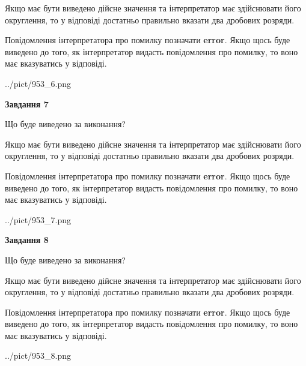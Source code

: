 \documentclass[12pt, ukrainian]{article}
\begin{document}
{\begin {Large}
Якщо має бути виведено дійсне значення та інтерпретатор має здійснювати його округлення, 
то у відповіді достатньо правильно вказати два дробових розряди.

Повідомлення інтерпретатора про помилку позначати \textbf{error}.
Якщо щось буде виведено до того, як інтерпретатор видасть повідомлення про помилку, 
то воно має вказуватись у відповіді. \par

\begin{center}
	{../pict/953_6.png}
\end{center}
\newpage

{\begin {center}\textbf{Завдання 7}\end {center}}\par
Що буде виведено за виконання? \par

Якщо має бути виведено дійсне значення та інтерпретатор має здійснювати його округлення, 
то у відповіді достатньо правильно вказати два дробових розряди.

Повідомлення інтерпретатора про помилку позначати \textbf{error}.
Якщо щось буде виведено до того, як інтерпретатор видасть повідомлення про помилку, 
то воно має вказуватись у відповіді. \par

\begin{center}
	{../pict/953_7.png}
\end{center}
\newpage

{\begin {center}\textbf{Завдання 8}\end {center}}\par
Що буде виведено за виконання? \par

Якщо має бути виведено дійсне значення та інтерпретатор має здійснювати його округлення, 
то у відповіді достатньо правильно вказати два дробових розряди.

Повідомлення інтерпретатора про помилку позначати \textbf{error}.
Якщо щось буде виведено до того, як інтерпретатор видасть повідомлення про помилку, 
то воно має вказуватись у відповіді. \par

\begin{center}
	{../pict/953_8.png}
\end{center}
\newpage


\end{Large}}
\end{document}
